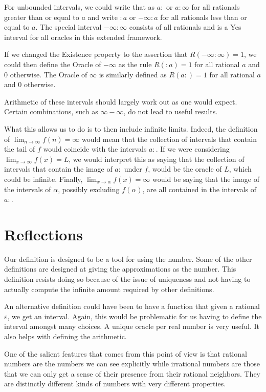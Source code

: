 \documentclass[12pt]{article}
\theoremstyle{remark}
\begin{document}
For unbounded intervals, we could write that as $a:$ or $a:\infty$ for all rationals greater than or equal to $a$ and write $:a$ or $-\infty:a$ for all rationals less than or equal to $a$. The special interval $-\infty:\infty$ consists of all rationals and is a Yes interval for all oracles in this extended framework. 

If we changed the Existence property to the assertion that $R(-\infty:\infty)=1$, we could then define the Oracle of $-\infty$ as the rule $R(:a) = 1$ for all rational $a$ and 0 otherwise. The Oracle of $\infty$ is similarly defined as $R(a:)=1$  for all rational $a$ and 0 otherwise. 

Arithmetic of these intervals should largely work out as one would expect. Certain combinations, such as $\infty-\infty$, do not lead to useful results. 

What this allows us to do is to then include infinite limits. Indeed, the definition of $\lim_{n\to \infty} f(n) = \infty$ would mean that the collection of intervals that contain the tail of $f$ would coincide with the intervals $a:$. If we were considering $\lim_{x \to \infty} f(x) = L$, we would interpret this as saying that the collection of intervals that contain the image of $a:$ under $f$, would be the oracle of $L$, which could be infinite.  Finally, $\lim_{x \to \alpha} f(x) = \infty$ would be saying that the image of the intervals of $\alpha$, possibly excluding $f(\alpha)$, are all contained in the intervals of $a:$. 


\section{Reflections}



Our definition is designed to be a tool for using the number. Some of the other definitions are designed at giving the approximations as the number. This definition resists doing so because of the issue of uniqueness and not having to actually compute the infinite amount required by other definitions. 

An alternative definition could have been to have a function that given a rational $\varepsilon$, we get an interval. Again, this would be problematic for us having to define the interval amongst many choices. A unique oracle per real number is very useful. It also helps with defining the arithmetic. 

One of the salient features that comes from this point of view is that rational numbers are the numbers we can see explicitly while irrational numbers are those that we can only get a sense of their presence from their rational neighbors. They are distinctly different kinds of numbers with very different properties. 
\end{document}
